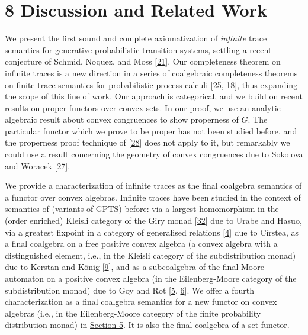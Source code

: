 %
\hypertarget{html:S8}{} \section*{8 Discussion and Related Work}
\hypertarget{html:S8.p1}{} We present the first sound and complete axiomatization of \emph{infinite} trace semantics for generative probabilistic transition systems, settling a recent conjecture of Schmid, Noquez, and Moss [\hyperlink{html:bib.bib21}{21}]. Our completeness theorem on infinite traces is a new direction in a series of coalgebraic completeness theorems on finite trace semantics for probabilistic process calculi [\hyperlink{html:bib.bib25}{25}, \hyperlink{html:bib.bib18}{18}], thus expanding the scope of this line of work. Our approach is categorical, and we build on recent results on proper functors over convex sets. In our proof, we use an analytic-algebraic result about convex congruences to show properness of %
\hypertarget{html:S8.p1.m1}{}\({G}\). The particular functor which we prove to be proper has not been studied before, and the properness proof technique of [\hyperlink{html:bib.bib28}{28}] does not apply to it, but remarkably we could use a result concerning the geometry of convex congruences due to Sokolova and Woracek [\hyperlink{html:bib.bib27}{27}].
\par\medskip
\hypertarget{html:S8.p2}{} We provide a characterization of infinite traces as the final coalgebra semantics of a functor over convex algebras. Infinite traces have been studied in the context of semantics of (variants of GPTS) before: via a largest homomorphism in the (order enriched) Kleisli category of the Giry monad [\hyperlink{html:bib.bib32}{32}] due to Urabe and Hasuo, via a greatest fixpoint in a category of generalised relations [\hyperlink{html:bib.bib4}{4}] due to Cîrstea, as a final coalgebra on a free positive convex algebra (a convex algebra with a distinguished element, i.e., in the Kleisli category of the subdistribution monad) due to Kerstan and König [\hyperlink{html:bib.bib9}{9}], and as a subcoalgebra of the final Moore automaton on a positive convex algebra (in the Eilenberg-Moore category of the subdistribution monad) due to Goy and Rot [\hyperlink{html:bib.bib5}{5}, \hyperlink{html:bib.bib6}{6}]. We offer a fourth characterization as a final coalgebra semantics for a new functor on convex algebras (i.e., in the Eilenberg-Moore category of the finite probability distribution monad) in \hyperlink{html:S5}{Section 5}. It is also the final coalgebra of a set functor.
